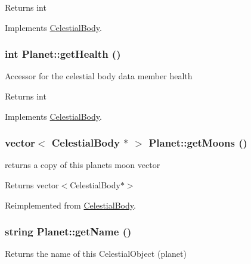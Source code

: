 \begin{DoxyReturn}{Returns}
int 
\end{DoxyReturn}


Implements \hyperlink{classCelestialBody}{CelestialBody}.

\hypertarget{classPlanet_a4499676225d09b0249cf225e795ce3cb}{
\subsubsection[{getHealth}]{\setlength{\rightskip}{0pt plus 5cm}int Planet::getHealth ()}}
\label{d5/dec/classPlanet_a4499676225d09b0249cf225e795ce3cb}
Accessor for the celestial body data member health

\begin{DoxyReturn}{Returns}
int 
\end{DoxyReturn}


Implements \hyperlink{classCelestialBody}{CelestialBody}.

\hypertarget{classPlanet_ac003f70ce4149dc5d87423dace7de0b1}{
\subsubsection[{getMoons}]{\setlength{\rightskip}{0pt plus 5cm}vector$<$ {\bf CelestialBody} $\ast$ $>$ Planet::getMoons ()}}
\label{d5/dec/classPlanet_ac003f70ce4149dc5d87423dace7de0b1}
returns a copy of this planets moon vector

\begin{DoxyReturn}{Returns}
vector$<$CelestialBody$\ast$$>$ 
\end{DoxyReturn}


Reimplemented from \hyperlink{classCelestialBody_a6c9db5c520596bc85a2e2a461db4b2c8}{CelestialBody}.

\hypertarget{classPlanet_a645b3d987a3001bac59a772b944607d2}{
\subsubsection[{getName}]{\setlength{\rightskip}{0pt plus 5cm}string Planet::getName ()}}
\label{d5/dec/classPlanet_a645b3d987a3001bac59a772b944607d2}
Returns the name of this CelestialObject (planet)

